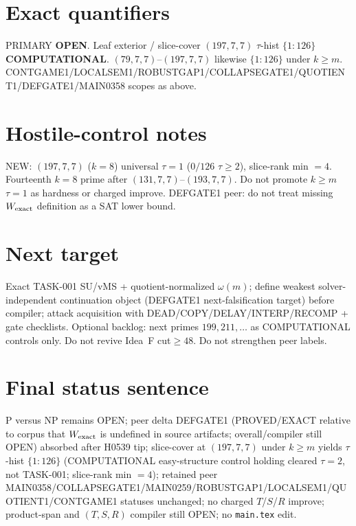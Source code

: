 \documentclass[11pt]{article}
\begin{document}
\section*{Exact quantifiers}
PRIMARY \textbf{OPEN}. Leaf exterior / slice-cover $(197,7,7)$ $\tau$-hist $\{1{:}126\}$ \textbf{COMPUTATIONAL}.
$(79,7,7)$--$(197,7,7)$ likewise $\{1{:}126\}$ under $k{\ge}m$. CONTGAME1/LOCALSEM1/ROBUSTGAP1/COLLAPSEGATE1/QUOTIENT1/DEFGATE1/MAIN0358 scopes as above.

\section*{Hostile-control notes}
NEW: $(197,7,7)$ ($k{=}8$) universal $\tau{=}1$ ($0/126$ $\tau{\ge}2$), slice-rank min $=4$.
Fourteenth $k{=}8$ prime after $(131,7,7)$--$(193,7,7)$.
Do not promote $k{\ge}m$ $\tau{=}1$ as hardness or charged improve.
DEFGATE1 peer: do not treat missing $W_{\rm exact}$ definition as a SAT lower bound.

\section*{Next target}
Exact TASK-001 SU/vMS + quotient-normalized $\omega(m)$; define weakest solver-independent
continuation object (DEFGATE1 next-falsification target) before compiler;
attack acquisition with DEAD/COPY/DELAY/INTERP/RECOMP + gate checklists.
Optional backlog: next primes $199,211,\ldots$ as COMPUTATIONAL controls only.
Do not revive Idea~F cut$\ge48$. Do not strengthen peer labels.

\section*{Final status sentence}
P versus NP remains OPEN; peer delta DEFGATE1 (PROVED/EXACT relative to corpus that $W_{\rm exact}$ is undefined in source artifacts; overall/compiler still OPEN) absorbed after H0539 tip; slice-cover at $(197,7,7)$ under $k{\ge}m$ yields $\tau$-hist $\{1{:}126\}$ (COMPUTATIONAL easy-structure control holding cleared $\tau{=}2$, not TASK-001; slice-rank min $=4$); retained peer MAIN0358/COLLAPSEGATE1/MAIN0259/ROBUSTGAP1/LOCALSEM1/QUOTIENT1/CONTGAME1 statuses unchanged; no charged $T$/$S$/$R$ improve; product-span and $(T,S,R)$ compiler still OPEN; no \texttt{main.tex} edit.
\end{document}
